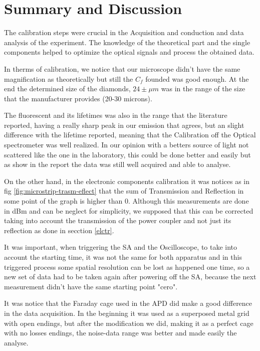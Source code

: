 \section{Summary and Discussion}
\label{sec:summary}

The calibration steps were crucial in the Acquisition and conduction and data analysis of the experiment.  The knowledge of the theoretical part and the single components helped to optimize the optical signals and process the obtained data.

In therms of calibration, we notice that our microscope didn't have the same magnification as theoretically but still the $C_{f}$ founded was good enough. At the end the  determined size of the diamonds,  $24 \pm \mu m$ was in the range of the size that the manufacturer provides (20-30 microns). 

The fluorescent and its lifetimes was also in the range that the literature reported, having a really sharp peak in our emission that agrees, but an slight difference with the lifetime reported, meaning that the Calibration off the Optical spectrometer was  well realized. In our opinion with a betters source of light not scattered like the one in the laboratory, this could be done better and easily  but as show in the report the data was still well acquired and able to analyse. 

On the other hand, in the electronic components calibration it was notices as in fig \ref{fig:microstrip-trasm-eflect} that the sum of Transmission and Reflection in some point of the graph is higher than 0. Although this measurements are done in dBm and can be neglect for simplicity, we supposed that this can be corrected taking into account the transmission of the power coupler and not just its reflection as done in secction \ref{elctr}.

It was important, when triggering the SA and the Oscilloscope, to take into account  the starting time, it was not the same for both apparatus and in this triggered process some spatial resolution can be lost as happened one time, so a new set of data had to be taken again after powering off the SA, because the next measurement didn't have the same starting point "cero".

It was notice that the Faraday cage used in the APD did make a good difference in the data acquisition. In the beginning it was used as a superposed metal grid  with open endings, but after the modification we did, making it as a perfect cage with no losses endings, the noise-data range was better and made easily the analyse. 

